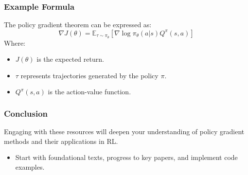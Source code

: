 \documentclass[aspectratio=169]{beamer}
\begin{document}
\begin{frame}[fragile]
    \frametitle{Example Formula}
    The policy gradient theorem can be expressed as:
    \begin{equation}
    \nabla J(\theta) = \mathbb{E}_{\tau \sim \pi_\theta} \left[ \nabla \log \pi_\theta(a | s) Q^\pi(s, a) \right]
    \end{equation}
    Where:
    \begin{itemize}
        \item $J(\theta)$ is the expected return.
        \item $\tau$ represents trajectories generated by the policy $\pi$.
        \item $Q^\pi(s, a)$ is the action-value function.
    \end{itemize}
\end{frame}

\begin{frame}[fragile]
    \frametitle{Conclusion}
    Engaging with these resources will deepen your understanding of policy gradient methods and their applications in RL. 
    \begin{itemize}
        \item Start with foundational texts, progress to key papers, and implement code examples.
    \end{itemize}
\end{frame}
\end{document}
